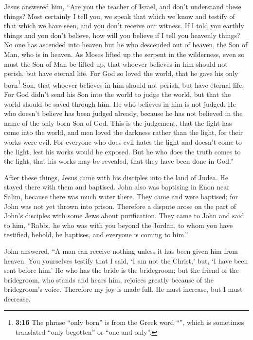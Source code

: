  Jesus answered him, ``Are you the teacher of Israel, and
don't understand these things?  Most certainly I tell
you, we speak that which we know and testify of that which we have seen,
and you don't receive our witness.  If I told you earthly
things and you don't believe, how will you believe if I tell you
heavenly things?  No one has ascended into heaven but he
who descended out of heaven, the Son of Man, who is in heaven.
 As Moses lifted up the serpent in the wilderness, even
so must the Son of Man be lifted up,  that whoever
believes in him should not perish, but have eternal life.
 For God so loved the world, that he gave his only
born\footnote{\textbf{3:16} The phrase ``only born'' is from the Greek
  word ``'', which is sometimes translated ``only
  begotten'' or ``one and only''.} Son, that whoever believes in him
should not perish, but have eternal life.  For God didn't
send his Son into the world to judge the world, but that the world
should be saved through him.  He who believes in him is
not judged. He who doesn't believe has been judged already, because he
has not believed in the name of the only born Son of God.
 This is the judgement, that the light has come into the
world, and men loved the darkness rather than the light, for their works
were evil.  For everyone who does evil hates the light
and doesn't come to the light, lest his works would be exposed.
 But he who does the truth comes to the light, that his
works may be revealed, that they have been done in God.''

 After these things, Jesus came with his disciples into
the land of Judea. He stayed there with them and baptised.
 John also was baptising in Enon near Salim, because
there was much water there. They came and were baptised; 
for John was not yet thrown into prison.  Therefore a
dispute arose on the part of John's disciples with some Jews about
purification.  They came to John and said to him,
``Rabbi, he who was with you beyond the Jordan, to whom you have
testified, behold, he baptises, and everyone is coming to him.''

 John answered, ``A man can receive nothing unless it has
been given him from heaven.  You yourselves testify that
I said, `I am not the Christ,' but, `I have been sent before him.'
 He who has the bride is the bridegroom; but the friend
of the bridegroom, who stands and hears him, rejoices greatly because of
the bridegroom's voice. Therefore my joy is made full. 
He must increase, but I must decrease.

